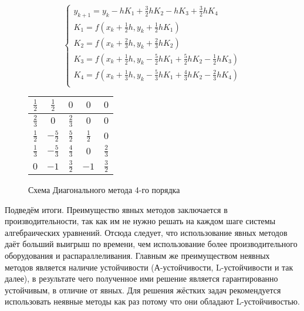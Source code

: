 \begin{figure}
    \begin{minipage}[t]{8.5cm}
        {\small
        \begin{equation*}
            \begin{cases}
                y_{k + 1} = y_k - hK_1 + \frac{3}{2}hK_2 - hK_3 + \frac{3}{2}hK_4\\
                K_1 = f(x_k + \frac{1}{2}h, y_k + \frac{1}{2}hK_1)\\
                K_2 = f(x_k + \frac{2}{3}h, y_k + \frac{2}{3}hK_2)\\
                K_3 = f(x_k + \frac{1}{2}h, y_k - \frac{5}{2}hK_1 + \frac{5}{2}hK_2 - \frac{1}{2}hK_3)\\
                K_4 = f(x_k + \frac{1}{3}h, y_k - \frac{5}{3}hK_1 + \frac{4}{3}hK_2 - \frac{2}{3}hK_4)\\
            \end{cases}
        \end{equation*}
        }
    \end{minipage}
    \begin{minipage}[t]{7.5cm}
        \begin{table}    
            \begin{tabular}{|c|c|c|c|c|}
            \hline
            $\frac{1}{2}$ & $\frac{1}{2}$ & $0$ & $0$ & $0$\\
            \hline
            $\frac{2}{3}$ & $0$ & $\frac{2}{3}$ & $0$ & $0$\\
            \hline
            $\frac{1}{2}$ & $-\frac{5}{2}$ & $\frac{5}{2}$ & $\frac{1}{2}$ & $0$\\
            \hline
            $\frac{1}{3}$ & $-\frac{5}{3}$ & $\frac{4}{3}$ & $0$ & $\frac{2}{3}$\\
            \hline
            $0$ & \cellcolor{lightgray} $-1$ & \cellcolor{lightgray} $\frac{3}{2}$ & \cellcolor{lightgray} $-1$ & \cellcolor{lightgray} $\frac{3}{2}$\\
            \hline
            \end{tabular}
        \end{table}
    \end{minipage}
    \caption{Схема Диагонального метода 4-го порядка}
    \label{fig:Diagonal4}
\end{figure}

Подведём итоги. Преимущество явных методов заключается в производительности, так как им не нужно решать на каждом шаге
системы алгебраических
уравнений. Отсюда следует, что использование явных методов даёт больший выигрыш по времени, чем использование более производительного
оборудования и распараллеливания. Главным же преимуществом неявных методов является наличие устойчивости (А-устойчивости, L-устойчивости и
так далее), в результате чего полученное ими решение является гарантированно устойчивым, в отличие от явных. Для решения жёстких задач
рекомендуется использовать неявные методы как раз потому что они обладают L-устойчивостью.

